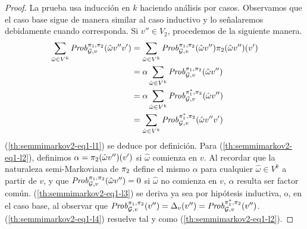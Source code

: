 \begin{proof}
  La prueba usa inducción en $k$ haciendo análisis por casos. Observamos que
  el caso base sigue de manera similar al caso inductivo y lo señalaremos debidamente cuando corresponda.
  Si $v'' \in V_2$, procedemos de la siguiente manera.
  \begin{align}	
    \label{th:semmimarkov2-eq1-l1}
    \sum_{\hat{\omega} \in V^k}\mathit{Prob}^{\pi_{1}, \pi_{2}}_{\mathcal{G},v}(\hat{\omega}v''v')
    & = \sum_{\hat{\omega} \in V^k}\mathit{Prob}^{\pi_{1}, \pi_{2}}_{\mathcal{G},v}(\hat{\omega}v'') \pi_{2}(\hat{\omega}v'')(v')\\
    \label{th:semmimarkov2-eq1-l2}
    & = \alpha \sum_{\hat{\omega} \in V^k}\mathit{Prob}^{\pi_{1}, \pi_{2}}_{\mathcal{G},v}(\hat{\omega}v'') \\
    \label{th:semmimarkov2-eq1-l3}
    & = \alpha \sum_{\hat{\omega} \in V^k}\mathit{Prob}^{\pi^*_{1}, \pi_{2}}_{\mathcal{G},v}(\hat{\omega}v'') \\
    \label{th:semmimarkov2-eq1-l4}
    & = \sum_{\hat{\omega} \in V^k}\mathit{Prob}^{\pi^*_{1}, \pi_{2}}_{\mathcal{G},v}(\hat{\omega}v''v')
  \end{align}
  (\ref{th:semmimarkov2-eq1-l1}) se deduce por definición.
  Para (\ref{th:semmimarkov2-eq1-l2}), definimos $\alpha =
  \pi_{2}(\hat{\omega}v'')(v')$ si $\hat{\omega}$ comienza en $v$. Al recordar que la naturaleza semi-Markoviana de $\pi_{2}$ define el
  mismo $\alpha$ para cualquier $\hat{\omega}\in V^k$ a partir de $v$, y que
  $\mathit{Prob}^{\pi_{1}, \pi_{2}}_{\mathcal{G},v}(\hat{\omega}v'') = 0$ si
  $\hat{\omega}$ no comienza en $v$, $\alpha$ resulta ser factor común.
  (\ref{th:semmimarkov2-eq1-l3}) se deriva ya sea por hipótesis inductiva, o, en el caso base, al observar que
  $\mathit{Prob}^{\pi_{1}, \pi_{2}}_{\mathcal{G},v}(v'') =
  \Delta_v(v'')=\mathit{Prob}^{\pi^*_{1}, \pi_{2}}_{\mathcal{G},v}(v'')$.
  (\ref{th:semmimarkov2-eq1-l4}) resuelve tal y como
  (\ref{th:semmimarkov2-eq1-l2}).


\end{proof}
